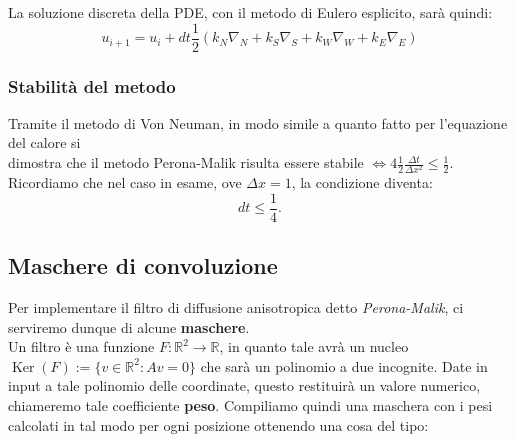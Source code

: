 La soluzione discreta della PDE, con il metodo di Eulero esplicito, sarà quindi:\\

$$
u_{i+1} = u_i + dt\frac{1}{2}(k_N\nabla_N + k_S\nabla_S + k_W\nabla_W + k_E\nabla_E)
$$

\subsubsection{Stabilità del metodo}
Tramite il metodo di Von Neuman, in modo simile a quanto fatto per l'equazione del calore si\\
\vspace{0.5em}
dimostra che il metodo Perona-Malik risulta essere stabile $\Longleftrightarrow 4\frac{1}{2}\frac{\Delta t}{\Delta x^2}\leq\frac{1}{2}$.\\
\vspace{0.5em}
Ricordiamo che nel caso in esame, ove $\Delta x=1$, la condizione diventa:
$$
dt\leq \frac{1}{4}.
$$
\vspace{1em}
\subsection{Maschere di convoluzione}
Per implementare il filtro di diffusione anisotropica detto \textit{Perona-Malik}, ci serviremo dunque di alcune \textbf{maschere}.\\
Un filtro è una funzione $F:\mathbb R^2\to\mathbb R$, in quanto tale avrà un nucleo $\operatorname{Ker}(F):=\{v \in \mathbb R^2: Av=0\}$ che sarà un polinomio a due incognite. Date in input a tale polinomio delle coordinate, questo restituirà un valore numerico, chiameremo tale coefficiente \textbf{peso}. Compiliamo quindi una maschera con i pesi calcolati in tal modo per ogni posizione ottenendo una cosa del tipo:

